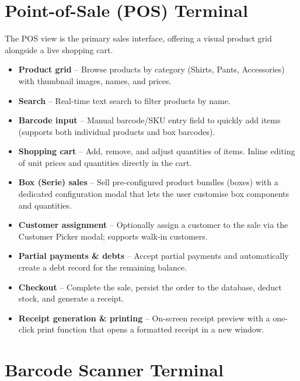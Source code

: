 \documentclass[12pt,a4paper]{article}
\begin{document}
\section{Point-of-Sale (POS) Terminal}

The POS view is the primary sales interface, offering a visual product grid
alongside a live shopping cart.

\begin{itemize}[leftmargin=1.5em]
  \item \textbf{Product grid} -- Browse products by category (Shirts, Pants,
        Accessories) with thumbnail images, names, and prices.
  \item \textbf{Search} -- Real-time text search to filter products by name.
  \item \textbf{Barcode input} -- Manual barcode/SKU entry field to quickly add
        items (supports both individual products and box barcodes).
  \item \textbf{Shopping cart} -- Add, remove, and adjust quantities of items.
        Inline editing of unit prices and quantities directly in the cart.
  \item \textbf{Box (Serie) sales} -- Sell pre-configured product bundles
        (boxes) with a dedicated configuration modal that lets the user
        customise box components and quantities.
  \item \textbf{Customer assignment} -- Optionally assign a customer to the
        sale via the Customer Picker modal; supports walk-in customers.
  \item \textbf{Partial payments \& debts} -- Accept partial payments and
        automatically create a debt record for the remaining balance.
  \item \textbf{Checkout} -- Complete the sale, persist the order to the
        database, deduct stock, and generate a receipt.
  \item \textbf{Receipt generation \& printing} -- On-screen receipt preview
        with a one-click print function that opens a formatted receipt in a
        new window.
\end{itemize}

\section{Barcode Scanner Terminal}
\end{document}
